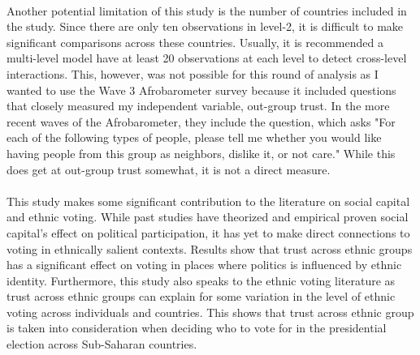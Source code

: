 \documentclass[a4paper, 12pt]{article}
\begin{document}
\paragraph{}
Another potential limitation of this study is the number of countries included in the study. Since there are only ten observations in level-2, it is difficult to make significant comparisons across these countries. Usually, it is recommended a multi-level model have at least 20 observations at each level to detect cross-level interactions\cite{kreftIntroducingMultilevelModeling1998}. This, however, was not possible for this round of analysis as I wanted to use the Wave 3 Afrobarometer survey because it included questions that closely measured my independent variable, out-group trust. In the more recent waves of the Afrobarometer, they include the question, which asks "For each of the following types of people, please tell me whether you would like having people from this group as neighbors, dislike it, or not care." While this does get at out-group trust somewhat, it is not a direct measure. 
\paragraph{}
This study makes some significant contribution to the literature on social capital and ethnic voting. While past studies have theorized and empirical proven social capital's effect on political participation, it has yet to make direct connections to voting in ethnically salient contexts. Results show that trust across ethnic groups has a significant effect on voting in places where politics is influenced by ethnic identity. Furthermore, this study also speaks to the ethnic voting literature as trust across ethnic groups can explain for some variation in the level of ethnic voting across individuals and countries. This shows that trust across ethnic group is taken into consideration when deciding who to vote for in the presidential election across Sub-Saharan countries. 
\end{document}
